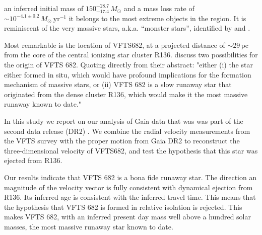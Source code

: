 \documentclass[apjl,twocolumn]{emulateapj}
\begin{document}
{ an inferred initial mass of $150^{+28.7}_{-17.4}\,M_\odot$  and a mass loss rate of  $\sim10^{-4.1\pm0.2}\,M_\odot \ \mathrm{yr}^{-1}$  \citep[][]{bestenlehner:11,schneider:18} it belongs to the most extreme objects in the region.  It is reminiscent of the very  massive stars, a.k.a. ``monster stars'', identified by  \citet{Crowther+2010} and \citet{Crowther+2016}. 
 
Most remarkable is the location of  VFTS682, at a projected distance of $\sim$$29$\,pc from the core of the central ionizing star cluster R136.   \citet{bestenlehner:11} discuss two possibilities for the  origin of VFTS 682. Quoting directly from their abstract:  "either (i) the star either formed in situ, which would have profound implications for the formation mechanism of massive stars, or (ii) VFTS 682 is a slow runaway star that originated from the dense cluster R136, which would make it the most massive runaway known to date."   

In this study we report on our analysis of Gaia data that was was part of the second data release (DR2) \cite[][]{gaia:16,brown:18}.  We combine the radial velocity measurements from the VFTS survey \citep[][]{evans:11} with the proper motion from Gaia DR2 to reconstruct the three-dimensional velocity of VFTS682, and test the hypothesis that this star was ejected from R136. 

Our results indicate that VFTS 682 is a bona fide runaway star.  The direction an magnitude of the velocity vector is fully consistent with dynamical ejection from R136.  Its inferred age is consistent with the inferred travel time. This means that the hypothesis that VFTS 682 is formed in relative isolation is rejected.  This makes VFTS 682, with an inferred present day mass well above a hundred solar masses, the most massive runaway star known to date. 
}


\end{document}

